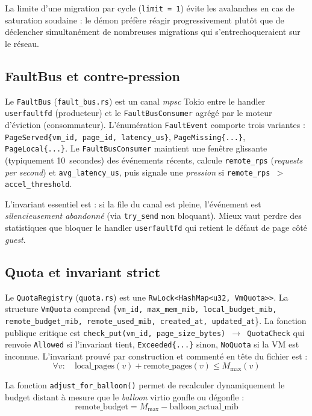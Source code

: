 La limite d'une migration par cycle (\texttt{limit = 1}) évite les avalanches en cas de saturation soudaine : le démon préfère réagir progressivement plutôt que de déclencher simultanément de nombreuses migrations qui s'entrechoqueraient sur le réseau.

\subsection{FaultBus et contre-pression}

Le \texttt{FaultBus} (\texttt{fault\_bus.rs}) est un canal \emph{mpsc} Tokio entre le handler \texttt{userfaultfd} (producteur) et le \texttt{FaultBusConsumer} agrégé par le moteur d'éviction (consommateur). L'énumération \texttt{FaultEvent} comporte trois variantes : \texttt{PageServed\{vm\_id, page\_id, latency\_us\}}, \texttt{PageMissing\{...\}}, \texttt{PageLocal\{...\}}. Le \texttt{FaultBusConsumer} maintient une fenêtre glissante (typiquement 10~secondes) des événements récents, calcule \texttt{remote\_rps} (\emph{requests per second}) et \texttt{avg\_latency\_us}, puis signale une \emph{pression} si \texttt{remote\_rps $>$ accel\_threshold}.

L'invariant essentiel est : si la file du canal est pleine, l'événement est \emph{silencieusement abandonné} (via \texttt{try\_send} non bloquant). Mieux vaut perdre des statistiques que bloquer le handler \texttt{userfaultfd} qui retient le défaut de page côté \emph{guest}.

\subsection{Quota et invariant strict}

Le \texttt{QuotaRegistry} (\texttt{quota.rs}) est une \texttt{RwLock<HashMap<u32, VmQuota>>}. La structure \texttt{VmQuota} comprend \{\texttt{vm\_id, max\_mem\_mib, local\_budget\_mib, remote\_budget\_mib, remote\_used\_mib, created\_at, updated\_at}\}. La fonction publique critique est \texttt{check\_put(vm\_id, page\_size\_bytes) $\to$ QuotaCheck} qui renvoie \texttt{Allowed} si l'invariant tient, \texttt{Exceeded\{...\}} sinon, \texttt{NoQuota} si la VM est inconnue. L'invariant prouvé par construction et commenté en tête du fichier est :
$$\forall v: \quad \text{local\_pages}(v) + \text{remote\_pages}(v) \le M_{\max}(v)$$

La fonction \texttt{adjust\_for\_balloon()} permet de recalculer dynamiquement le budget distant à mesure que le \emph{balloon} virtio gonfle ou dégonfle :
$$\text{remote\_budget} = M_{\max} - \text{balloon\_actual\_mib}$$

